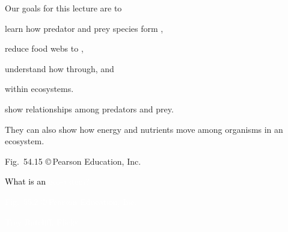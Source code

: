 \documentclass[t]{beamer}
\begin{document}
%
%	
%


\begin{frame}{Our goals for this lecture are to}

	\hangpara learn how predator and prey species form ,

	\hangpara reduce food webs to , 
	
	\hangpara understand how  through, and
	
	\hangpara {} within ecosystems.
	
	
	
\end{frame}
%
{
\begin{frame}{}
\hspace{65mm}\begin{minipage}{0.45\textwidth}
	\flushleft
	\vspace{4\baselineskip}

	 show relationships among predators and prey.
	\vspace{\baselineskip}
	
	They can also show how energy and nutrients move among organisms in an ecosystem.
\end{minipage}

	\vfilll
	
	\hfill \tiny Fig.~54.15 \copyright\,Pearson Education, Inc.
\end{frame}
}
%
{
\begin{frame}[b]{\textcolor{black}{What is an \textcolor{white}{ecosystem?} }}

\tiny \textcolor{white}{Fig.~55.2 \copyright\,Pearson Education, Inc.}
\end{frame}
}
%
{
\begin{frame}[b]

	\hfill \tiny \textcolor{white}{Trey Ratcliff, Flickr }
\end{frame}
}
\end{document}
